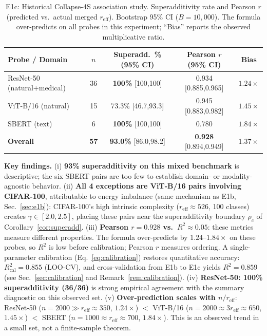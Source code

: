 \documentclass{article}
\begin{document}
\begin{table}[h]
\centering
\caption{E1c: Historical Collapse-4S association study.
Superadditivity rate and Pearson $r$ (predicted vs.\ actual merged $r_{\mathrm{eff}}$).
Bootstrap 95\% CI ($B=10{,}000$). The formula over-predicts on all probes
in this experiment; ``Bias'' reports the observed multiplicative ratio.}
\label{tab:e1c}
\small
\setlength{\tabcolsep}{3.5pt}
\begin{tabular}{lcccc}
\toprule
Probe / Domain & $n$ & Superadd.\ \% (95\% CI) & Pearson $r$ (95\% CI) & Bias \\
\midrule
ResNet-50 (natural+medical)   & 36 & \textbf{100\%} [100,100]  & 0.934 [0.885,0.965] & $1.24\times$ \\
ViT-B/16 (natural)            & 15 & 73.3\% [46.7,93.3]        & 0.945 [0.883,0.982] & $1.45\times$ \\
SBERT (text)                  &  6 & \textbf{100\%} [100,100]  & 0.780                & $1.84\times$ \\
\midrule
\textbf{Overall}              & \textbf{57} & \textbf{93.0\%} [86.0,98.2] & \textbf{0.928} [0.894,0.949] & $1.37\times$ \\
\bottomrule
\end{tabular}\normalsize
\end{table}

\textbf{Key findings.}
(i) \textbf{93\% superadditivity on this mixed benchmark} is descriptive;
the six SBERT pairs are too few to establish domain- or modality-agnostic behavior.
(ii) \textbf{All 4 exceptions are ViT-B/16 pairs involving CIFAR-100},
attributable to energy imbalance (same mechanism as E1b, Sec.~\ref{sec:e1b}):
CIFAR-100's high intrinsic complexity ($r_{\mathrm{eff}}\approx526$, 100 classes)
creates $\gamma\in[2.0,2.5]$, placing these pairs near the superadditivity
boundary $\rho_c$ of Corollary~\ref{cor:superadd}.
(iii) \textbf{Pearson $r=0.928$ vs.\ $R^2\approx0.05$}: these metrics measure
different properties.
The formula over-predicts by $1.24$--$1.84\times$ on these probes, so
$R^2$ is low before calibration; Pearson $r$ measures ordering.
A single-parameter calibration (Eq.~\ref{eq:calibration})
restores quantitative accuracy: $R^2_{\mathrm{cal}}{=}0.855$ (LOO-CV),
and cross-validation from E1b to E1c yields $R^2{=}0.859$
(see Sec.~\ref{sec:calibration} and Remark~\ref{rem:calibration}).
(iv) \textbf{ResNet-50: 100\% superadditivity (36/36)} is strong empirical
agreement with the summary diagnostic on this observed set.
(v) \textbf{Over-prediction scales with $n/r_{\mathrm{eff}}$}:
ResNet-50 ($n=2000\gg r_{\mathrm{eff}}\approx350$, $1.24\times$)
$<$ ViT-B/16 ($n=2000\approx3r_{\mathrm{eff}}\approx650$, $1.45\times$)
$<$ SBERT ($n=1000\approx r_{\mathrm{eff}}\approx700$, $1.84\times$).
This is an observed trend in a small set, not a finite-sample theorem.
\end{document}
